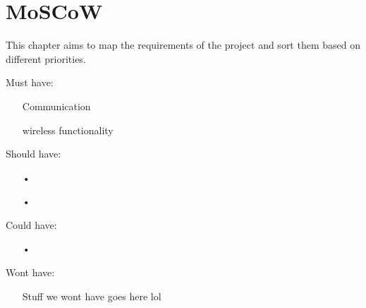 \chapter{MoSCoW}
This chapter aims to map the requirements of the project and sort them based on different priorities.

Must have:
\begin{itemize}
\item[Communication]
\item[wireless functionality]
\end{itemize}

Should have:
\begin{itemize}
\item[•]
\item[•]
\end{itemize}

Could have:
\begin{itemize}
\item[•]
\end{itemize}

Wont have:
\begin{itemize}
\item[Stuff we wont have goes here lol]
\end{itemize}







